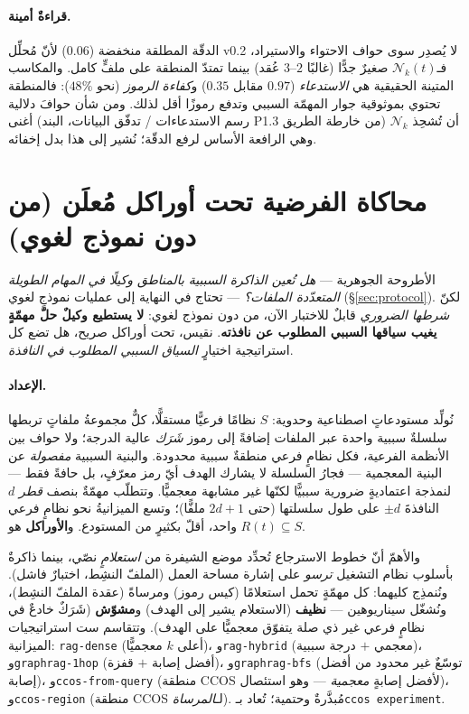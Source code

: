 \documentclass[11pt]{article}
\newcommand{\Nk}{\mathcal{N}_k}
\newcommand{\code}[1]{\textenglish{\texttt{#1}}}
\begin{document}
\paragraph{قراءةٌ أمينة.} الدقّة المطلقة منخفضة ($0.06$) لأنّ مُحلِّل v0.2 لا يُصدِر سوى
حواف الاحتواء والاستيراد، فـ$\Nk(t)$ صغيرٌ جدًّا (غالبًا $2$--$3$ عُقد) بينما تمتدّ المنطقة
على ملفٍّ كامل. والمكاسب المتينة الحقيقية هي \emph{الاستدعاء} ($0.97$ مقابل $0.35$)
و\emph{كفاءة الرموز} (نحو $48\%$): فالمنطقة تحتوي بموثوقية جوار المهمّة السببي وتدفع رموزًا
أقل لذلك. ومن شأن حوافَ دلالية أغنى (رسم الاستدعاءات / تدفّق البيانات، البند P1.3 من خارطة
الطريق) أن تُشحِذ $\Nk$ وهي الرافعة الأساس لرفع الدقّة؛ نُشير إلى هذا بدل إخفائه.

\section{محاكاة الفرضية تحت أوراكل مُعلَن (من دون نموذج لغوي)}\label{sec:sim}

الأطروحة الجوهرية --- \emph{هل تُعين الذاكرة السببية بالمناطق وكيلًا في المهام الطويلة
المتعدّدة الملفات؟} --- تحتاج في النهاية إلى عمليات نموذجٍ لغوي (\S\ref{sec:protocol}). لكنّ
\emph{شرطها الضروري} قابلٌ للاختبار الآن، من دون نموذج لغوي: \textbf{لا يستطيع وكيلٌ حلّ
مهمّةٍ يغيب سياقها السببي المطلوب عن نافذته}. نقيس، تحت أوراكل صريح، هل تضع كل استراتيجية
اختيارٍ \emph{السياق السببي المطلوب في النافذة}.

\paragraph{الإعداد.} نُولِّد مستودعاتٍ اصطناعية وحدوية: $S$ نظامًا فرعيًّا مستقلًّا، كلٌّ
مجموعةُ ملفاتٍ تربطها سلسلةٌ سببية واحدة عبر الملفات إضافةً إلى رموز \emph{شَرَك} عالية
الدرجة؛ ولا حواف بين الأنظمة الفرعية، فكل نظامٍ فرعي منطقةٌ سببية محدودة. والبنية السببية
\emph{مفصولة} عن البنية المعجمية --- فجارُ السلسلة لا يشارك الهدف أيّ رمز معرّفٍ، بل حافةً
فقط --- لنمذجة اعتماديةٍ ضرورية سببيًّا لكنّها غير مشابهة معجميًّا. وتتطلّب مهمّةٌ بنصف
\emph{قطر} $d$ النافذةَ $\pm d$ على طول سلسلتها (حتى $2d{+}1$ ملفًّا)؛ وتسع الميزانيةُ نحو
نظامٍ فرعي واحد، أقلّ بكثيرٍ من المستودع. و\textbf{الأوراكل} هو $R(t)\subseteq S$.

والأهمّ أنّ خطوط الاسترجاع تُحدِّد موضع الشيفرة من \emph{استعلامٍ} نصّي، بينما ذاكرةٌ بأسلوب
نظام التشغيل \emph{ترسو} على إشارة مساحة العمل (الملفّ النشِط، اختبارٌ فاشل). ونُنمذِج كليهما:
كل مهمّةٍ تحمل استعلامًا (كيس رموز) ومرساةً (عقدة الملفّ النشِط)، ونُشغّل سيناريوهين ---
\textbf{نظيف} (الاستعلام يشير إلى الهدف) و\textbf{مشوّش} (شَرَكٌ خادعٌ في نظامٍ فرعي غير ذي
صلة يتفوّق معجميًّا على الهدف). وتتقاسم ست استراتيجيات الميزانية: \code{rag-dense} (أعلى
$k$ معجميًّا)، و\code{rag-hybrid} (معجمي $+$ درجة سببية)، و\code{graphrag-1hop} (أفضل إصابة
$+$ قفزة)، و\code{graphrag-bfs} (توسّعٌ غير محدود من أفضل إصابة)، و\code{ccos-from-query}
(منطقة CCOS لأفضل إصابةٍ \emph{معجمية} --- وهو استئصال)، و\code{ccos-region} (منطقة CCOS
لـ\emph{المرساة}). مُبذَّرةٌ وحتمية؛ تُعاد بـ\code{ccos experiment}.
\end{document}

